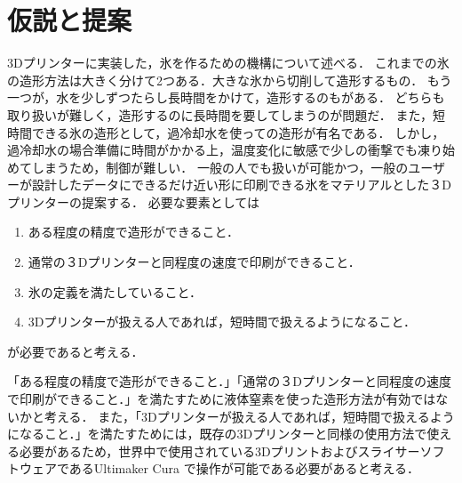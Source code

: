 \chapter{仮説と提案}
\label{chp:first}

3Dプリンターに実装した，氷を作るための機構について述べる．
これまでの氷の造形方法は大きく分けて2つある．大きな氷から切削して造形するもの．
もう一つが，水を少しずつたらし長時間をかけて，造形するのもがある．
どちらも取り扱いが難しく，造形するのに長時間を要してしまうのが問題だ．
また，短時間できる氷の造形として，過冷却水を使っての造形が有名である．
しかし，過冷却水の場合準備に時間がかかる上，温度変化に敏感で少しの衝撃でも凍り始めてしまうため，制御が難しい．
一般の人でも扱いが可能かつ，一般のユーザーが設計したデータにできるだけ近い形に印刷できる氷をマテリアルとした３Dプリンターの提案する．
必要な要素としては

\begin{enumerate}
  \item ある程度の精度で造形ができること． 
  \item 通常の３Dプリンターと同程度の速度で印刷ができること．
  \item 氷の定義を満たしていること．
  \item 3Dプリンターが扱える人であれば，短時間で扱えるようになること．
 \end{enumerate}

が必要であると考える．

「ある程度の精度で造形ができること．」「通常の３Dプリンターと同程度の速度で印刷ができること．」を満たすために液体窒素を使った造形方法が有効ではないかと考える．
また，「3Dプリンターが扱える人であれば，短時間で扱えるようになること．」を満たすためには，既存の3Dプリンターと同様の使用方法で使える必要があるため，世界中で使用されている3DプリントおよびスライサーソフトウェアであるUltimaker Cura で操作が可能である必要があると考える．

